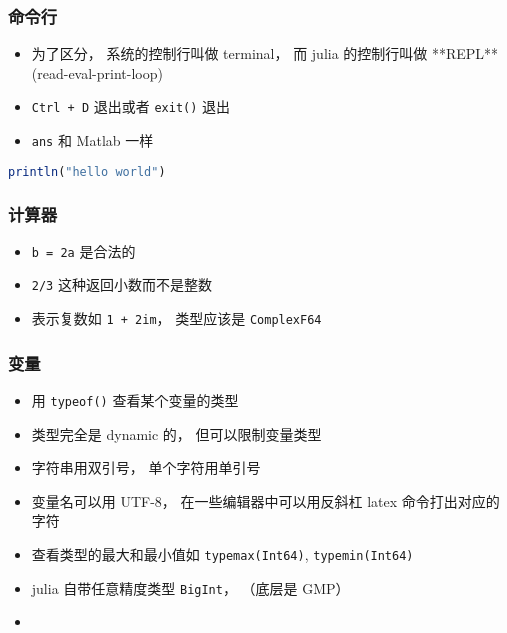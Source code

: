 
\begin{issues}
\issueDraft
\end{issues}

\subsubsection{命令行}
\begin{itemize}
\item 为了区分， 系统的控制行叫做 terminal， 而 julia 的控制行叫做 **REPL** (read-eval-print-loop)
\item \verb|Ctrl + D| 退出或者 \verb|exit()| 退出
\item \verb|ans| 和 Matlab 一样
\end{itemize}

\begin{lstlisting}[language=julia]
println("hello world")
\end{lstlisting}

\subsubsection{计算器}
\begin{itemize}
\item \verb|b = 2a| 是合法的
\item \verb|2/3| 这种返回小数而不是整数
\item 表示复数如 \verb|1 + 2im|， 类型应该是 \verb|ComplexF64|
\end{itemize}

\subsubsection{变量}
\begin{itemize}
\item 用 \verb|typeof()| 查看某个变量的类型
\item 类型完全是 dynamic 的， 但可以限制变量类型
\item 字符串用双引号， 单个字符用单引号
\item 变量名可以用 UTF-8， 在一些编辑器中可以用反斜杠 latex 命令打出对应的字符
\item 查看类型的最大和最小值如 \verb|typemax(Int64)|, \verb|typemin(Int64)|
\item julia 自带任意精度类型 \verb|BigInt|，  （底层是 GMP）
\item 
\end{itemize}

